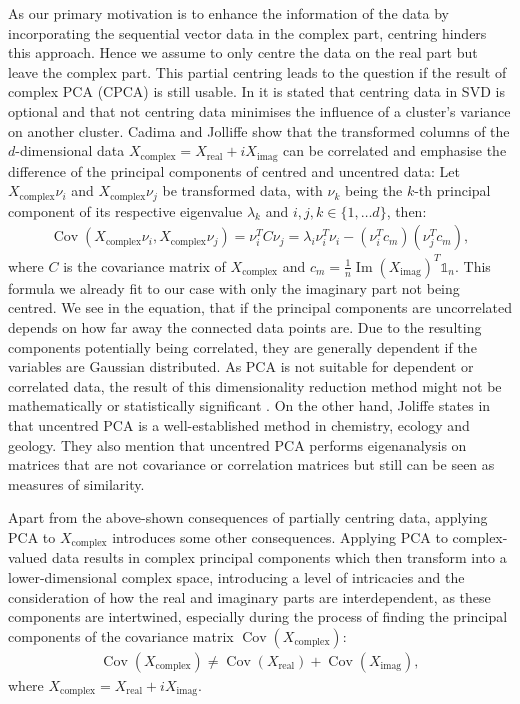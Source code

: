 \documentclass[pdftex,12pt,a4paper]{report}
\begin{document}
As our primary motivation is to enhance the information of the data by incorporating the sequential vector data in the complex part, centring hinders this approach.
Hence we assume to only centre the data on the real part but leave the complex part.
This partial centring leads to the question if the result of complex PCA (CPCA) is still usable.
In \cite{uncentered-pca-burned} it is stated that centring data in SVD is optional and that not centring data minimises the influence of a cluster's variance on another cluster. 
Cadima and Jolliffe \cite{relation-centered-uncentered-PCA} show that the transformed columns of the $d$-dimensional data $X_{\mathrm{complex}} = X_{\mathrm{real}} + i X_{\mathrm{imag}}$ can be correlated and emphasise the difference of the principal components of centred and uncentred data:
Let $X_{\mathrm{complex}}\nu_i$ and $X_{\mathrm{complex}}\nu_j$ be transformed data, with $\nu_k$ being the $k$-th principal component of its respective eigenvalue $\lambda_k$ and $i,j,k \in \{1, \dots d\}$, then:
\begin{align*}
    \operatorname{Cov}(X_{\mathrm{complex}}\nu_i, X_{\mathrm{complex}}\nu_j) = \nu_i^T C \nu_j = \lambda_i \nu_i^T \nu_i - (\nu_i^Tc_m)(\nu_j^T c_m), 
\end{align*}
where $C$ is the covariance matrix of $X_{\mathrm{complex}}$ and $c_m = \frac{1}{n} \operatorname{Im}(X_{\mathrm{imag}})^T \mathbb{1}_n$.
This formula we already fit to our case with only the imaginary part not being centred.
We see in the equation, that if the principal components are uncorrelated depends on how far away the connected data points are.
Due to the resulting components potentially being correlated, they are generally dependent if the variables are Gaussian distributed.
As PCA is not suitable for dependent or correlated data, the result of this dimensionality reduction method might not be mathematically or statistically significant \cite{pca-only-independent}.
On the other hand, Joliffe states in \cite{PCA-joliffe} that uncentred PCA is a well-established method in chemistry, ecology and geology. 
They also mention that uncentred PCA performs eigenanalysis on matrices that are not covariance or correlation matrices but still can be seen as measures of similarity.

Apart from the above-shown consequences of partially centring data, applying PCA to $X_{\mathrm{complex}}$ introduces some other consequences.
Applying PCA to complex-valued data results in complex principal components which then transform into a lower-dimensional complex space, introducing a level of intricacies and the consideration of how the real and imaginary parts are interdependent, as these components are intertwined, especially during the process of finding the principal components of the covariance matrix $\operatorname{Cov}(X_{\mathrm{complex}})$:
\begin{align*}
    \operatorname{Cov}(X_{\mathrm{complex}}) \neq \operatorname{Cov}(X_{\mathrm{real}}) + \operatorname{Cov}(X_{\mathrm{imag}})
    ,
\end{align*}
where $X_{\mathrm{complex}} = X_{\mathrm{real}} + iX_{\mathrm{imag}}$.
\end{document}
